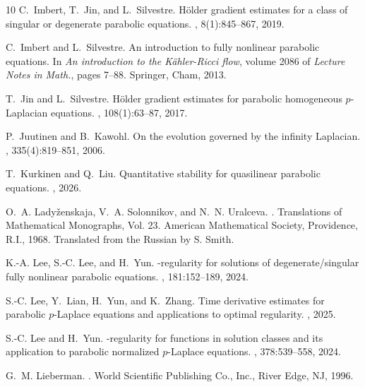 \documentclass[a4paper,11pt]{amsart}
\theoremstyle{plain}
\theoremstyle{definition}
\numberwithin{equation}{section}
\begin{document}
\begin{thebibliography}{10}
	C.~Imbert, T.~Jin, and L.~Silvestre.
	\newblock H\"older gradient estimates for a class of singular or degenerate
	parabolic equations.
	, 8(1):845--867, 2019.
	
	C.~Imbert and L.~Silvestre.
	\newblock An introduction to fully nonlinear parabolic equations.
	\newblock In {\em An introduction to the {K}\"ahler-{R}icci flow}, volume 2086
	of {\em Lecture Notes in Math.}, pages 7--88. Springer, Cham, 2013.
	
	T.~Jin and L.~Silvestre.
	\newblock H\"{o}lder gradient estimates for parabolic homogeneous
	{$p$}-{L}aplacian equations.
	, 108(1):63--87, 2017.
	
	P.~Juutinen and B.~Kawohl.
	\newblock On the evolution governed by the infinity {Laplacian}.
	, 335(4):819--851, 2006.
	
	T.~Kurkinen and Q.~Liu.
	\newblock Quantitative stability for quasilinear parabolic equations.
	, 2026.
	
	O.~A. Lady\v{z}enskaja, V.~A. Solonnikov, and N.~N. Uralceva.
	.
	\newblock Translations of Mathematical Monographs, Vol. 23. American
	Mathematical Society, Providence, R.I., 1968.
	\newblock Translated from the Russian by S. Smith.
	
	K.-A. Lee, S.-C. Lee, and H.~Yun.
	-regularity for solutions of degenerate/singular
	fully nonlinear parabolic equations.
	, 181:152--189, 2024.
	
	S.-C. Lee, Y.~Lian, H.~Yun, and K.~Zhang.
	\newblock Time derivative estimates for parabolic {$p$}-{L}aplace equations and
	applications to optimal regularity.
	, 2025.
	
	S.-C. Lee and H.~Yun.
	-regularity for functions in solution classes and its
	application to parabolic normalized {$p$}-{L}aplace equations.
	, 378:539--558, 2024.
	
	G.~M. Lieberman.
	.
	\newblock World Scientific Publishing Co., Inc., River Edge, NJ, 1996.
	

\end{thebibliography}
\end{document}
